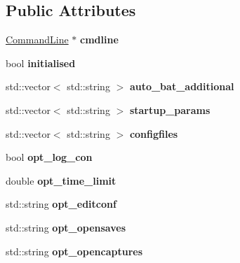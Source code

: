 \subsection*{Public Attributes}
\begin{DoxyCompactItemize}
\item 
\hypertarget{classConfig_a85c171fec7b0dca3394b0970d18b200b}{\hyperlink{classCommandLine}{Command\-Line} $\ast$ {\bfseries cmdline}}\label{classConfig_a85c171fec7b0dca3394b0970d18b200b}

\item 
\hypertarget{classConfig_a492c364942ee53ee9932ee76c4f16875}{bool {\bfseries initialised}}\label{classConfig_a492c364942ee53ee9932ee76c4f16875}

\item 
\hypertarget{classConfig_ae7246e0f40afb1afc997b402b850d09d}{std\-::vector$<$ std\-::string $>$ {\bfseries auto\-\_\-bat\-\_\-additional}}\label{classConfig_ae7246e0f40afb1afc997b402b850d09d}

\item 
\hypertarget{classConfig_a01b46fafa05ea47df307dffbea481b84}{std\-::vector$<$ std\-::string $>$ {\bfseries startup\-\_\-params}}\label{classConfig_a01b46fafa05ea47df307dffbea481b84}

\item 
\hypertarget{classConfig_a8f671b3c470a89df8117d8ba22226f2d}{std\-::vector$<$ std\-::string $>$ {\bfseries configfiles}}\label{classConfig_a8f671b3c470a89df8117d8ba22226f2d}

\item 
\hypertarget{classConfig_a2031057d31ac0e4696749731ebb97d51}{bool {\bfseries opt\-\_\-log\-\_\-con}}\label{classConfig_a2031057d31ac0e4696749731ebb97d51}

\item 
\hypertarget{classConfig_afb13d7b31833fa2ff011dae8ad248970}{double {\bfseries opt\-\_\-time\-\_\-limit}}\label{classConfig_afb13d7b31833fa2ff011dae8ad248970}

\item 
\hypertarget{classConfig_ae1af1b76c02ff9c5e8a3609fe741bd46}{std\-::string {\bfseries opt\-\_\-editconf}}\label{classConfig_ae1af1b76c02ff9c5e8a3609fe741bd46}

\item 
\hypertarget{classConfig_aaef446ee5dae8a296cbeeb0985f2f2bb}{std\-::string {\bfseries opt\-\_\-opensaves}}\label{classConfig_aaef446ee5dae8a296cbeeb0985f2f2bb}

\item 
\hypertarget{classConfig_a4a75343c067ac35055e4b44d07d13803}{std\-::string {\bfseries opt\-\_\-opencaptures}}\label{classConfig_a4a75343c067ac35055e4b44d07d13803}


\end{DoxyCompactItemize}
